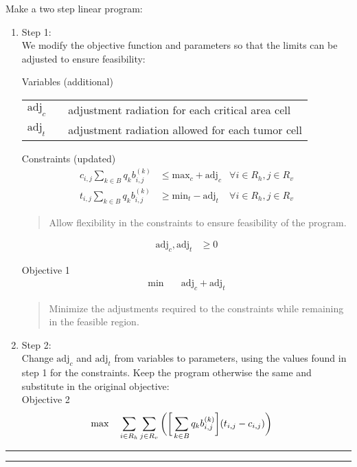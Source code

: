 \documentclass[12pt]{article}
\makeatletter
\newenvironment{task}{\@startsection
       {section}{1}
       {0.4em}{-.5ex plus -1ex minus -.2ex}{.5ex plus .2ex}
       {\pagebreak[3]\large\bf\noindent{Task}}}
       {\nopagebreak[3]\vspace{3ex}\begin{center}\rule{1\linewidth}{.3pt}\end{center}}
\newenvironment{subtask}{\@startsection
       {subsection}{2}
       {0.3em}{0ex plus -1ex minus -.2ex}{.5ex plus .2ex}
       {\pagebreak[3]\large}}
       {\nopagebreak[3]\vspace{3ex}\begin{center}\rule{0.5\linewidth}{.3pt}\end{center}}
\makeatother
\begin{document}
\begin{task}{}
\begin{subtask}{}
Make a two step linear program:
\begin{enumerate}
\item Step 1: \\
We modify the objective function and parameters so that the limits can be adjusted to ensure feasibility:

Variables (additional)\\ 
\begin{tabular}{lll}
	$\text{adj}_{c}$ & & adjustment radiation for each critical area cell \\
	$\text{adj}_{t}$ & & adjustment radiation allowed for each tumor cell \\
\end{tabular}

Constraints (updated)
\begin{align}
	c_{i,j} \sum_{k \in B} q_k b^{(k)}_{i,j} & \leq \text{max}_c + \text{adj}_c & \forall i \in R_h, j \in R_v\\
	t_{i,j} \sum_{k \in B} q_k b^{(k)}_{i,j} & \geq \text{min}_t - \text{adj}_t & \forall i \in R_h, j \in R_v
\end{align}
\begin{quote}Allow flexibility in the constraints to ensure feasibility of the program.\end{quote}
\begin{align}
	\text{adj}_{c}, \text{adj}_{t} & \geq 0
\end{align}

Objective 1
\begin{align}
	\min \quad
	& \text{adj}_c  + \text{adj}_t
\end{align}
\begin{quote}Minimize the adjustments required to the constraints while remaining in the feasible region.\end{quote}

\item Step 2: \\
Change $\text{adj}_c$ and $\text{adj}_t$ from variables to parameters, using the values found in step 1 for the constraints.  Keep the program otherwise the same and substitute in the original objective:\\

Objective 2
\begin{align}
	\max \quad
	& \sum_{i\in R_h} \sum_{j \in R_v}\bigg{(} \bigg{[} \sum_{k \in B} q_k b^{(k)}_{i,j} \bigg{]} (t_{i,j} - c_{i,j}) \bigg{)}
\end{align}


\end{enumerate}
\end{subtask}
\end{task}
\end{document}
